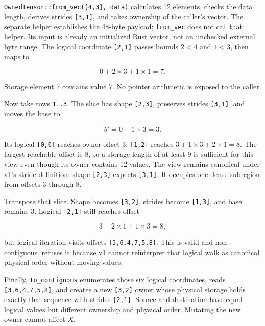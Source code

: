 \texttt{OwnedTensor::from\_vec({[}4,3{]},\ data)} calculates 12
elements, checks the data length, derives strides \texttt{{[}3,1{]}},
and takes ownership of the caller's vector. The separate
\texttt{} helper establishes the 48-byte
payload; \texttt{from\_vec} does not call that helper. Its input is
already an initialized Rust vector, not an unchecked external byte
range. The logical coordinate \texttt{{[}2,1{]}} passes bounds \(2<4\)
and \(1<3\), then maps to

\begin{equation}
0 + 2\times3 + 1\times1 = 7.
\end{equation}

Storage element 7 contains value 7. No pointer arithmetic is exposed to
the caller.

Now take rows \texttt{1..3}. The slice has shape \texttt{{[}2,3{]}},
preserves strides \texttt{{[}3,1{]}}, and moves the base to

\begin{equation}
b'=0+1\times3=3.
\end{equation}

Its logical \texttt{{[}0,0{]}} reaches owner offset 3;
\texttt{{[}1,2{]}} reaches \(3+1\times3+2\times1=8\). The largest
reachable offset is 8, so a storage length of at least 9 is sufficient
for this view even though its owner contains 12 values. The view remains
canonical under v1's stride definition: shape \texttt{{[}2,3{]}} expects
\texttt{{[}3,1{]}}. It occupies one dense subregion from offsets 3
through 8.

Transpose that slice. Shape becomes \texttt{{[}3,2{]}}, strides become
\texttt{{[}1,3{]}}, and base remains 3. Logical \texttt{{[}2,1{]}} still
reaches offset

\begin{equation}
3+2\times1+1\times3=8,
\end{equation}

but logical iteration visits offsets \texttt{{[}3,6,4,7,5,8{]}}. This is
valid and non-contiguous. \texttt{} refuses
it because v1 cannot reinterpret that logical walk as canonical physical
order without moving values.

Finally, \texttt{to\_contiguous} enumerates those six logical
coordinates, reads \texttt{{[}3,6,4,7,5,8{]}}, and creates a new
\texttt{{[}3,2{]}} owner whose physical storage holds exactly that
sequence with strides \texttt{{[}2,1{]}}. Source and destination have
equal logical values but different ownership and physical order.
Mutating the new owner cannot affect \(X\).

